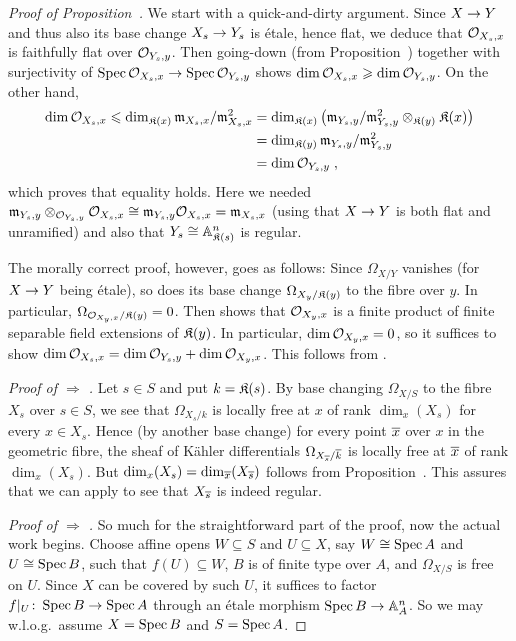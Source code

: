 \documentclass[a4paper,parskip=half,numbers=enddot, DIV=12]{scrreprt}
\renewcommand{\geq}{\geqslant}
\renewcommand{\leq}{\leqslant}
\begin{document}
\begin{proof}[Proof of Proposition~]
	We start with a quick-and-dirty argument. Since $X\morphism Y$ and thus also its base change $X_s\morphism Y_s$ is étale, hence flat, we deduce that $\mathcal{O}_{X_s,x}$ is faithfully flat over $\mathcal{O}_{Y_s,y}$. Then going-down (from Proposition~) together with surjectivity of $\Spec \Oo_{X_s,x}\morphism\Spec\Oo_{Y_s,y}$ shows $\dim\Oo_{X_s,x}\geq \dim\Oo_{Y_s,y}$. On the other hand,
	\begin{align*}
		\dim\Oo_{X_s,x}\leq \dim_{\KK(x)}\mm_{X_s,x}/\mm_{X_s,x}^2&=\dim_{\KK(x)}\left(\mm_{Y_s,y}/\mm_{Y_s,y}^2\otimes_{\KK(y)}\KK(x)\right)\\
		&=\dim_{\KK(y)}\mm_{Y_s,y}/\mm_{Y_s,y}^2\\
		&=\dim\Oo_{Y_s,y}\;,
	\end{align*}
	which proves that equality holds. Here we needed $\mathfrak{m}_{Y_s,y}\otimes_{\mathcal{O}_{Y_s,y}}\mathcal{O}_{X_s,x}\cong \mathfrak{m}_{Y_s,y}\mathcal{O}_{X_s,x}=\mathfrak{m}_{X_s,x}$ (using that $X\morphism Y$ is both flat and unramified) and also that $Y_s\cong\mathbb{A}_{\mathfrak{K}(s)}^n$ is regular.
	
	The morally correct proof, however, goes as follows: Since $\Omega_{X/Y}$ vanishes (for $X\morphism Y$ being étale), so does its base change $\Omega_{X_y/\mathfrak{K}(y)}$ to the fibre over $y$. In particular, $\Omega_{\mathcal{O}_{X_y,x}/\mathfrak{K}(y)}=0$. Then \cite[Corollary~16.16]{eisenbudCommAlg} shows that $\mathcal{O}_{X_y,x}$ is a finite product of finite separable field extensions of $\mathfrak{K}(y)$. In particular, $\dim\mathcal{O}_{X_y,x}=0$, so it suffices to show $\dim\mathcal{O}_{X_s,x}=\dim\mathcal{O}_{Y_s,y}+\dim\mathcal{O}_{X_y,x}$. This follows from \cite[]{stacks-project}.
	
	\emph{Proof of  $\Rightarrow$ .} Let $s\in S$ and put $k=\mathfrak{K}(s)$. By base changing $\Omega_{X/S}$ to the fibre $X_s$ over $s\in S$, we see that $\Omega_{X_s/k}$ is locally free at $x$ of rank $\dim_x(X_s)$ for every $x\in X_s$. Hence (by another base change) for every point $\overline{x}$ over $x$ in the geometric fibre, the sheaf of Kähler differentials $\Omega_{X_{\overline{s}}/\smash{\overline{k}}}$ is locally free at $\overline{x}$ of rank $\dim_x(X_s)$. But $\dim_x(X_s)=\dim_{\overline{x}}(X_{\overline{s}})$ follows from Proposition~. This  assures that we can apply \cite[Proposition~1.6.3]{alg2} to see that $X_{\overline{s}}$ is indeed regular.
	
	\emph{Proof of  $\Rightarrow$ .} So much for the straightforward part of the proof, now the actual work begins. Choose affine opens $W\subseteq S$ and $U\subseteq X$, say $W\cong \operatorname{Spec} A$ and $U\cong \operatorname{Spec} B$, such that $f(U)\subseteq W$, $B$ is of finite type over $A$, and $\Omega_{X/S}$ is free on $U$. Since $X$ can be covered by such $U$, it suffices to factor $f|_U\colon \Spec B\morphism\Spec A$ through an étale morphism $\Spec B\morphism \IA_A^n$. So we may w.l.o.g.\ assume $X=\operatorname{Spec} B$ and $S=\operatorname{Spec} A$.
	

\end{proof}
\end{document}

